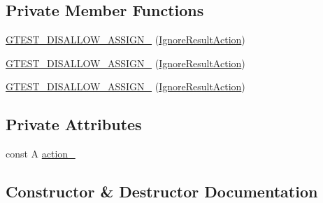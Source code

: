 \subsection*{Private Member Functions}
\begin{DoxyCompactItemize}
\item 
\mbox{\hyperlink{classtesting_1_1internal_1_1_ignore_result_action_a6d42dfd3fd05fbbd24f6856e7bd82ab9}{G\+T\+E\+S\+T\+\_\+\+D\+I\+S\+A\+L\+L\+O\+W\+\_\+\+A\+S\+S\+I\+G\+N\+\_\+}} (\mbox{\hyperlink{classtesting_1_1internal_1_1_ignore_result_action}{Ignore\+Result\+Action}})
\item 
\mbox{\hyperlink{classtesting_1_1internal_1_1_ignore_result_action_a6d42dfd3fd05fbbd24f6856e7bd82ab9}{G\+T\+E\+S\+T\+\_\+\+D\+I\+S\+A\+L\+L\+O\+W\+\_\+\+A\+S\+S\+I\+G\+N\+\_\+}} (\mbox{\hyperlink{classtesting_1_1internal_1_1_ignore_result_action}{Ignore\+Result\+Action}})
\item 
\mbox{\hyperlink{classtesting_1_1internal_1_1_ignore_result_action_a6d42dfd3fd05fbbd24f6856e7bd82ab9}{G\+T\+E\+S\+T\+\_\+\+D\+I\+S\+A\+L\+L\+O\+W\+\_\+\+A\+S\+S\+I\+G\+N\+\_\+}} (\mbox{\hyperlink{classtesting_1_1internal_1_1_ignore_result_action}{Ignore\+Result\+Action}})
\end{DoxyCompactItemize}
\subsection*{Private Attributes}
\begin{DoxyCompactItemize}
\item 
const A \mbox{\hyperlink{classtesting_1_1internal_1_1_ignore_result_action_a3a1ad6d29d904acb4ca41eeee45de4a0}{action\+\_\+}}
\end{DoxyCompactItemize}


\subsection{Constructor \& Destructor Documentation}
\mbox{\label{classtesting_1_1internal_1_1_ignore_result_action_a9199f7b1b7771b2e2a5fd28caf624623}} 
